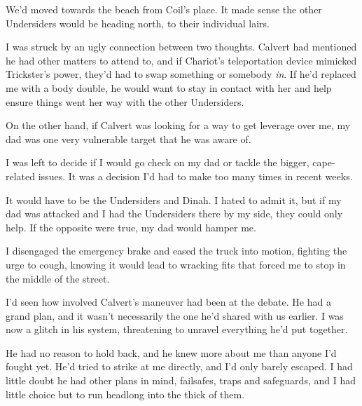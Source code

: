 We'd moved towards the beach from Coil's place.  It made sense the other Undersiders would be heading north, to their individual lairs.



I was struck by an ugly connection between two thoughts.  Calvert had mentioned he had other matters to attend to, and if Chariot's teleportation device mimicked Trickster's power, they'd had to swap something or somebody \emph{in}.  If he'd replaced me with a body double, he would want to stay in contact with her and help ensure things went her way with the other Undersiders.



On the other hand, if Calvert was looking for a way to get leverage over me, my dad was one very vulnerable target that he was aware of.



I was left to decide if I would go check on my dad or tackle the bigger, cape-related issues.  It was a decision I'd had to make too many times in recent weeks.



It would have to be the Undersiders and Dinah.  I hated to admit it, but if my dad was attacked and I had the Undersiders there by my side, they could only help.  If the opposite were true, my dad would hamper me.



I disengaged the emergency brake and eased the truck into motion, fighting the urge to cough, knowing it would lead to wracking fits that forced me to stop in the middle of the street.



I'd seen how involved Calvert's maneuver had been at the debate.  He had a grand plan, and it wasn't necessarily the one he'd shared with us earlier.  I was now a glitch in his system, threatening to unravel everything he'd put together.



He had no reason to hold back, and he knew more about me than anyone I'd fought yet.  He'd tried to strike at me directly, and I'd only barely escaped.  I had little doubt he had other plans in mind, failsafes, traps and safeguards, and I had little choice but to run headlong into the thick of them.





